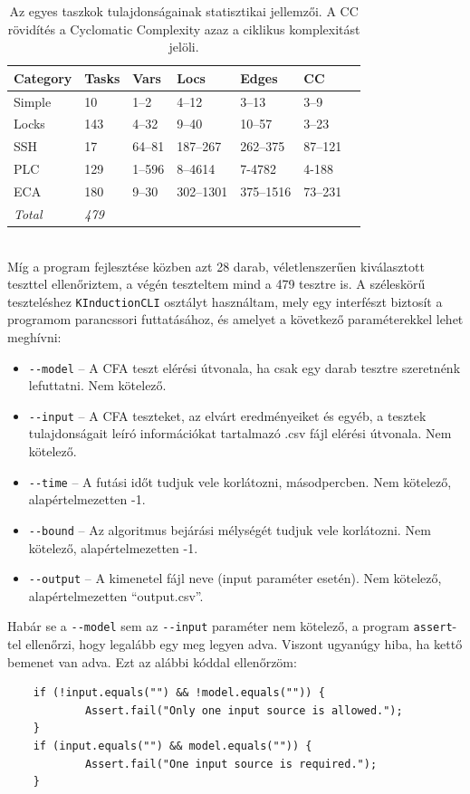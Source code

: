 \begin{table}[h] 
	\centering
	\begin{tabular}{lllllll}
		\toprule
		Category & Tasks & Vars & Locs & Edges & CC\\
		\midrule
		Simple & 10 & 1--2 & 4--12 & 3--13 & 3--9\\
		Locks & 143 & 4--32 & 9--40 & 10--57 & 3--23\\
		SSH & 17 & 64--81 & 187--267 & 262--375 & 87--121\\
		PLC & 129 & 1--596 & 8--4614 & 7-4782 & 4-188\\
		ECA & 180 & 9--30 & 302--1301 & 375--1516 & 73--231\\
		
		\bottomrule
		\textit{Total} & \textit{479}\\
	\end{tabular}
	\caption{Az egyes taszkok tulajdonságainak statisztikai jellemzői. A CC rövidítés a Cyclomatic Complexity azaz a ciklikus komplexitást jelöli.}
	\label{table:tasksStat}
\end{table}
\ \\
Míg a program fejlesztése közben azt 28 darab, véletlenszerűen kiválasztott teszttel ellenőriztem, a végén teszteltem mind a 479 tesztre is. A széleskörű teszteléshez \texttt{KInductionCLI} osztályt használtam, mely egy interfészt biztosít a programom parancssori futtatásához, és amelyet a következő paraméterekkel lehet meghívni:

\begin{itemize}
	\item \texttt{-{}-model} -- A CFA teszt elérési útvonala, ha csak egy darab tesztre szeretnénk lefuttatni. Nem kötelező.
	\item \texttt{-{}-input} -- A CFA teszteket, az elvárt eredményeiket és egyéb, a tesztek tulajdonságait leíró információkat tartalmazó .csv fájl elérési útvonala. Nem kötelező.
	\item \texttt{-{}-time} -- A futási időt tudjuk vele korlátozni, másodpercben. Nem kötelező, alapértelmezetten -1.
	\item \texttt{-{}-bound} -- Az algoritmus bejárási mélységét tudjuk vele korlátozni. Nem kötelező, alapértelmezetten -1.
	\item \texttt{-{}-output} -- A kimenetel fájl neve (input paraméter esetén). Nem kötelező, alapértelmezetten ``output.csv''.
\end{itemize}
Habár se a \texttt{-{}-model} sem az \texttt{-{}-input} paraméter nem kötelező, a program \texttt{assert}-tel ellenőrzi, hogy legalább egy meg legyen adva. Viszont ugyanúgy hiba, ha kettő bemenet van adva. Ezt az alábbi kóddal ellenőrzöm:
\ \\
\begin{lstlisting}
	if (!input.equals("") && !model.equals("")) {
			Assert.fail("Only one input source is allowed.");
	}
	if (input.equals("") && model.equals("")) {
			Assert.fail("One input source is required.");
	}
\end{lstlisting}

